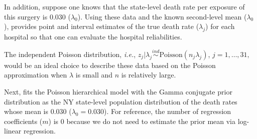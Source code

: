 \documentclass[article]{jss}
\begin{document}
In addition, suppose one knows that the state-level death rate per exposure of this surgery is 0.030 ($\lambda_{0}$). Using these data and the known second-level mean ($\lambda_{0}$),  provides point and interval estimates of the true death rate ($\lambda_{j}$) for each hospital so that one can evaluate the hospital reliabilities. 


The independent Poisson distribution, \emph{i.e.},  $z_{j}\vert \lambda_{j}\stackrel{ind}{\sim} \textrm{Poisson}(n_{j}\lambda_{j})$, $j=1, \ldots, 31,$ would be an ideal choice to describe these data based on the Poisson approximation when $\lambda$ is small and $n$ is relatively large. 


Next,  fits the Poisson hierarchical model with the Gamma conjugate prior distribution as the NY state-level population distribution of the death rates whose mean is 0.030 ($\lambda_{0}=0.030$). For reference, the number of regression coefficients ($m$) is 0 because we do not need to estimate the prior mean via log-linear regression.
\end{document}
